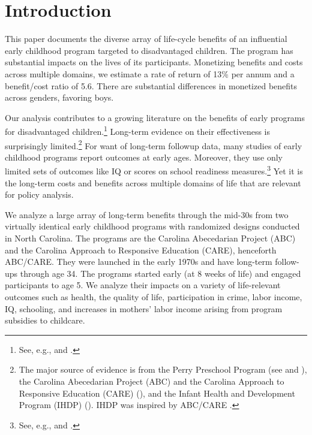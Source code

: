 \clearpage
\doublespacing

\setcounter{page}{0}

\section{Introduction}

This paper documents the diverse array of life-cycle benefits of an influential early childhood program targeted to disadvantaged children. The program has substantial impacts on the lives of its participants. Monetizing benefits and costs across multiple domains, we estimate a rate of return of 13\% per annum and a benefit/cost ratio of 5.6. There are substantial differences in monetized benefits across genders, favoring boys.

Our analysis contributes to a growing literature on the benefits of early programs for disadvantaged children.\footnote{See, e.g., \cite{Currie_2011_AER} and \cite{Elango_Hojman_etal_2016_Early-Edu}.} Long-term evidence on their effectiveness is surprisingly limited.\footnote{The major source of evidence is from the Perry Preschool Program (see \citealp{Schweinhart_Montie_ea_2005_BOOKlifetime} and \citealp{Heckman_Moon_etal_2010_RateofReturn,Heckman_Moon_etal_2010_QE}), the Carolina Abecedarian Project (ABC) and the Carolina Approach to Responsive Education (CARE) (\citealp{Ramey_Campbell_etal_2000_ADS,Ramey-etal_2012-ABC}), and the Infant Health and Development Program (IHDP) (\citealp{Gross_Spiker_etal_1997_BOOKHelpinglowbirth,Duncan_Sojourner_2013_JHR}). IHDP was inspired by ABC/CARE \citep[][]{Gross_Spiker_etal_1997_BOOKHelpinglowbirth}.} For want of long-term followup data, many studies of early childhood programs report outcomes at early ages. Moreover, they use only limited sets of outcomes like IQ or scores on school readiness measures.\footnote{See, e.g., \cite{Kline_Walters_2016_QJE} and \cite{Weiland_2013_CD_Impacts-of-Pre-K}.} Yet it is the long-term costs and benefits across multiple domains of life that are relevant for policy analysis.

We analyze a large array of long-term benefits through the mid-30s from two virtually identical early childhood programs with randomized designs conducted in North Carolina. The programs are the Carolina Abecedarian Project (ABC) and the Carolina Approach to Responsive Education (CARE), henceforth ABC/CARE. They were launched in the early 1970s and have long-term follow-ups through age 34. The programs started early (at 8 weeks of life) and engaged participants to age 5. We analyze their impacts on a variety of life-relevant outcomes such as health, the quality of life, participation in crime, labor income, IQ, schooling, and increases in mothers' labor income arising from program subsidies to childcare.

